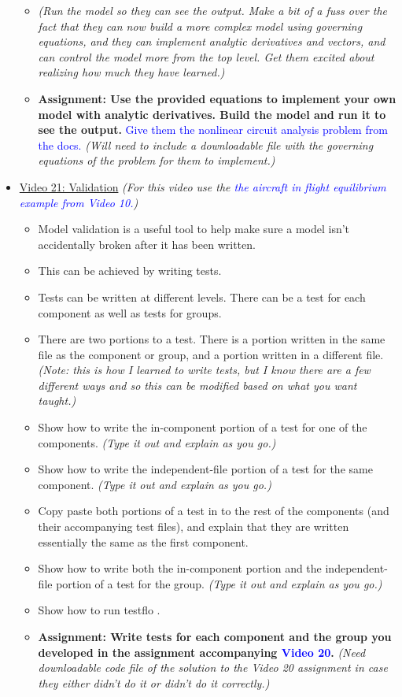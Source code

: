 \documentclass[12pt, letterpaper]{article}
\begin{document}
\begin{itemize}
\begin{itemize}
			\item \textit{(Run the model so they can see the output. Make a bit of a fuss over the fact that they can now build a more complex model using governing equations, and they can implement analytic derivatives and vectors, and can control the model more from the top level. Get them excited about realizing how much they have learned.)}
			\item \textbf{Assignment: Use the provided equations to implement your own model with analytic derivatives. Build the model and run it to see the output.} \textcolor{blue}{Give them the nonlinear circuit analysis problem from the docs.} \textit{(Will need to include a downloadable file with the governing equations of the problem for them to implement.)}
		\end{itemize}
		
	\item \underline{Video 21: Validation} \textit{(For this video use the \textcolor{blue}{the aircraft in flight equilibrium example from Video 10.})} 
		\begin{itemize}
			\item Model validation is a useful tool to help make sure a model isn’t accidentally broken after it has been written.
			\item This can be achieved by writing tests.
			\item Tests can be written at different levels. There can be a test for each component as well as tests for groups. 
			\item There are two portions to a test. There is a portion written in the same file as the component or group, and a portion written in a different file. \textit{(Note: this is how I learned to write tests, but I know there are a few different ways and so this can be modified based on what you want taught.)}
			\item Show how to write the in-component portion of a test for one of the components. \textit{(Type it out and explain as you go.)}
			\item Show how to write the independent-file portion of a test for the same component. \textit{(Type it out and explain as you go.)}
			\item Copy paste both portions of a test in to the rest of the components (and their accompanying test files), and explain that they are written essentially the same as the first component.
			\item Show how to write both the in-component portion and the independent-file portion of a test for the group. \textit{(Type it out and explain as you go.)}
			\item Show how to run testflo .
			\item \textbf{Assignment: Write tests for each component and the group you developed in the assignment accompanying \textcolor{blue}{Video 20}.} \textit{(Need downloadable code file of the solution to the Video 20 assignment in case they either didn't do it or didn't do it correctly.)}
		\end{itemize}
	

\end{itemize}
\end{document}
